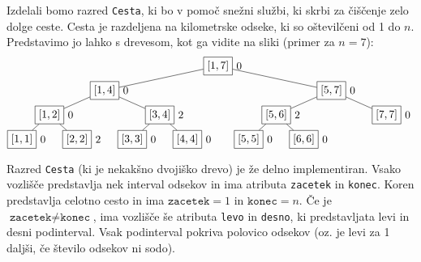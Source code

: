 \documentclass[arhiv]{../izpit}
\begin{document}


\noindent Izdelali bomo razred \texttt{Cesta}, ki bo v pomoč snežni službi, ki skrbi za čiš\-čenje zelo dolge ceste. Cesta je razdeljena na kilometrske odseke, ki so oštevilčeni od 1 do $n$. Predstavimo jo lahko s drevesom, kot ga vidite na sliki (primer za $n = 7$):
$$
\begin{tikzpicture}[level distance=0.8cm,
    level 1/.style={sibling distance=7.4cm},
    level 2/.style={sibling distance=3.6cm},
    level 3/.style={sibling distance=1.8cm}
    ]
    \node[rectangle, draw, label=0:0] (d) {$[1, 7]$}
      child {node[rectangle, draw, label=0:0] {$[1, 4]$}
        child {node[rectangle, draw, label=0:0] {$[1, 2]$}
          child {node[rectangle, draw, label=0:0] {$[1, 1]$}}
          child {node[rectangle, draw, label=0:2] {$[2, 2]$}}
        }
        child {node[rectangle, draw, label=0:2] {$[3, 4]$}
          child {node[rectangle, draw, label=0:0] {$[3, 3]$}}
          child {node[rectangle, draw, label=0:0] {$[4, 4]$}}
        }
      }
      child {node[rectangle, draw, label=0:0] {$[5, 7]$}
        child {node[rectangle, draw, label=0:2] {$[5, 6]$}
          child {node[rectangle, draw, label=0:0] {$[5, 5]$}}
          child {node[rectangle, draw, label=0:0] {$[6, 6]$}}
        }
        child {node[rectangle, draw, label=0:0] {$[7, 7]$}}
      };
  \end{tikzpicture}
$$
Razred \texttt{Cesta} (ki je nekakšno dvojiško drevo) je že delno implementiran. Vsako vozlišče predstav\-lja nek interval odsekov in ima atributa \texttt{zacetek} in \texttt{konec}. Koren predstavlja celotno cesto in ima $\texttt{zacetek} = 1$ in $\texttt{konec} = n$. Če je $\texttt{zacetek} \neq \texttt{konec}$, ima vozlišče še atributa \texttt{levo} in \texttt{desno}, ki predstavljata levi in desni podinterval. Vsak podinterval pokriva polovico odsekov (oz. je levi za 1 daljši, če število odsekov ni sodo).
\end{document}
